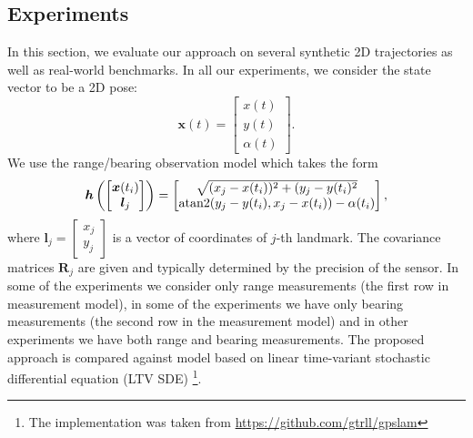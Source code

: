\subsection{Experiments}
In this section, we evaluate our approach
on several synthetic 2D trajectories
as well as real-world benchmarks.
In all our experiments, we consider the state vector to be a 2D pose:
\[
    \bm{x}(t) = \begin{bmatrix}
    x(t) \\
    y(t) \\
    \alpha(t)
    \end{bmatrix}.
\]
We use the range/bearing observation model which takes the form
\begin{equation}
\label{eq:observation_function}
    \bm{h}\left (\begin{bmatrix}
            \bm{x}(t_i) \\
            \bm{l}_j
        \end{bmatrix}
    \right ) =
    \begin{bmatrix}
        \sqrt{(x_j - x(t_i))^2 + (y_j - y(t_i)^2} \\
        {\rm atan2}(y_j - y(t_i), x_j - x(t_i)) - \alpha(t_i)\\
    \end{bmatrix} ,
\end{equation}
where $\bm{l}_j = \begin{bmatrix}
x_j \\
y_j
\end{bmatrix}$ is a vector of coordinates of $j$-th landmark.
The covariance matrices $\mathbf{R}_j$ are
given and typically determined by the precision of the sensor.
In some of the experiments we consider
only range measurements
(the first row in measurement model),
in some of the experiments we have only
bearing measurements (the second row in the measurement model)
and in other experiments we have both
range and bearing measurements.
The proposed approach is compared against model based
on linear time-variant stochastic differential equation (LTV SDE)
\cite{barfoot}\footnote{The implementation was taken from
\url{https://github.com/gtrll/gpslam}}.


